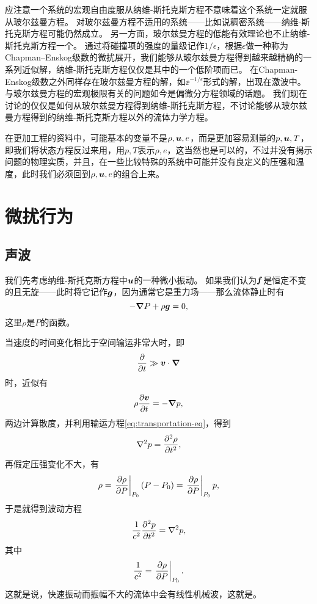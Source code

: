 应注意一个系统的宏观自由度服从纳维-斯托克斯方程不意味着这个系统一定就服从玻尔兹曼方程。
对玻尔兹曼方程不适用的系统——比如说稠密系统——纳维-斯托克斯方程可能仍然成立。
另一方面，玻尔兹曼方程的低能有效理论也不止纳维-斯托克斯方程一个。
通过将碰撞项的强度的量级记作$1/\epsilon$，根据$\epsilon$做一种称为Chapman–Enskog级数的微扰展开\cite{chapman_mathematical_1990}，我们能够从玻尔兹曼方程得到越来越精确的一系列近似解，纳维-斯托克斯方程仅仅是其中的一个低阶项而已。
在Chapman-Enskog级数之外同样存在玻尔兹曼方程的解，如$\ee^{- 1 / \epsilon}$形式的解，出现在激波中。    
与玻尔兹曼方程的宏观极限有关的问题如今是偏微分方程领域的话题。
我们现在讨论的仅仅是如何从玻尔兹曼方程得到纳维-斯托克斯方程，不讨论能够从玻尔兹曼方程得到的纳维-斯托克斯方程以外的流体力学方程。

在更加工程的资料中，可能基本的变量不是$\rho, \vb*{u}, e$，而是更加容易测量的$p, \vb*{u}, T$，即我们将状态方程反过来用，用$p, T$表示$\rho, e$，这当然也是可以的，不过并没有揭示问题的物理实质，并且，在一些比较特殊的系统中可能并没有良定义的压强和温度，此时我们必须回到$\rho, \vb*{u}, e$的组合上来。

\section{微扰行为}

\subsection{声波}

我们先考虑纳维-斯托克斯方程中$\vb*{u}$的一种微小振动。
如果我们认为$\vb*{f}$是恒定不变的且无旋——此时将它记作$\vb*{g}$，因为通常它是重力场——那么流体静止时有
\begin{equation}
    - \grad{P} + \rho \vb*{g} = 0,
\end{equation}
这里$\rho$是$P$的函数。

当速度的时间变化相比于空间输运非常大时，即
\[
    \pdv{t} \gg \vb*{v} \cdot \grad
\]
时，近似有
\begin{equation}
    \rho \pdv{\vb*{v}}{t} = - \grad{p},
    \label{eq:ns-eq-small-v}
\end{equation}
两边计算散度，并利用输运方程\eqref{eq:transportation-eq}，得到
\[
    \laplacian{p} = \pdv[2]{\rho}{t},
\]
再假定压强变化不大，有
\[
    \rho = \eval{\pdv{\rho}{P}}_{P_0} (P - P_0) = \eval{\pdv{\rho}{P}}_{P_0} p,
\]
于是就得到波动方程
\begin{equation}
    \frac{1}{c^2} \pdv[2]{p}{t} = \laplacian{p},
    \label{eq:sound-wave-fluid}
\end{equation}
其中
\begin{equation}
    \frac{1}{c^2} = \eval{\pdv{\rho}{P}}_{P_0}.
\end{equation}
这就是说，快速振动而振幅不大的流体中会有线性机械波，这就是。

